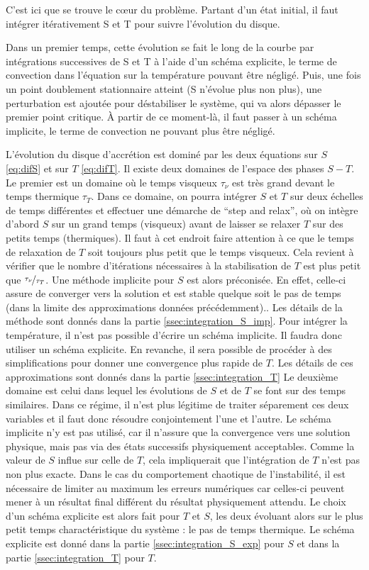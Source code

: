 C’est ici que se trouve le cœur du problème. Partant d’un état initial, il faut
intégrer itérativement S et T pour suivre l’évolution du disque.

Dans un premier temps, cette évolution se fait le long de la courbe par
intégrations successives de S et T à l’aide d’un schéma explicite, le terme de
convection dans l’équation sur la température pouvant être négligé. Puis, une
fois un point doublement stationnaire atteint (S n’évolue plus non plus), une
perturbation est ajoutée pour déstabiliser le système, qui va alors dépasser le
premier point critique. À partir de ce moment-là, il faut passer à un schéma
implicite, le terme de convection ne pouvant plus être négligé. 


L'évolution du disque d'accrétion est dominé par les deux équations sur $S$ \eqref{eq:difS} et sur $T$ \eqref{eq:difT}. Il existe deux domaines de l'espace des phases $S-T$. Le premier est un domaine où le temps visqueux $\tau_\nu$ 
est très grand devant le temps thermique $\tau_T$. Dans ce domaine, on pourra intégrer $S$ et $T$ sur deux échelles de temps différentes et effectuer une démarche de ``step and relax'', où on intègre d'abord $S$ sur un grand temps (visqueux) avant de laisser se relaxer $T$ sur des petits temps (thermiques). Il faut à cet endroit faire attention à ce que le temps de relaxation de $T$ soit toujours plus petit que le temps visqueux. Cela revient à vérifier que le nombre d'itérations nécessaires à la stabilisation de $T$ est plus petit que $\nicefrac{\tau_\nu}{\tau_T}$. Une méthode implicite pour $S$ est alors préconisée. En effet, celle-ci assure de converger vers la solution et est stable quelque soit le pas de temps (dans la limite des approximations données précédemment).. Les détails de la méthode sont donnés dans la partie \ref{ssec:integration_S_imp}. Pour intégrer la température, il n'est pas possible d'écrire un schéma implicite. Il faudra donc utiliser un schéma explicite. En revanche, il sera possible de procéder à des simplifications pour donner une convergence plus rapide de $T$. Les détails de ces approximations sont donnés dans la partie \ref{ssec:integration_T}
Le deuxième domaine est celui dans lequel les évolutions de $S$ et de $T$ se font sur des temps similaires. Dans ce régime, il n'est plus légitime de traiter séparement ces deux variables et il faut donc résoudre conjointement l'une et l'autre. Le schéma implicite n'y est pas utilisé, car il n'assure que la convergence vers une solution physique, mais pas via des états successifs physiquement acceptables. Comme la valeur de $S$ influe sur celle de $T$, cela impliquerait que l'intégration de $T$ n'est pas non plus exacte. Dans le cas du comportement chaotique de l'instabilité, il est nécessaire de limiter au maximum les erreurs numériques car celles-ci peuvent mener à un résultat final différent du résultat physiquement attendu. Le choix d'un schéma explicite est alors fait pour $T$ et $S$, les deux évoluant alors sur le plus petit temps charactéristique du système : le pas de temps thermique. Le schéma explicite est donné dans la partie \ref{ssec:integration_S_exp} pour $S$ et dans la partie \ref{ssec:integration_T} pour $T$.


